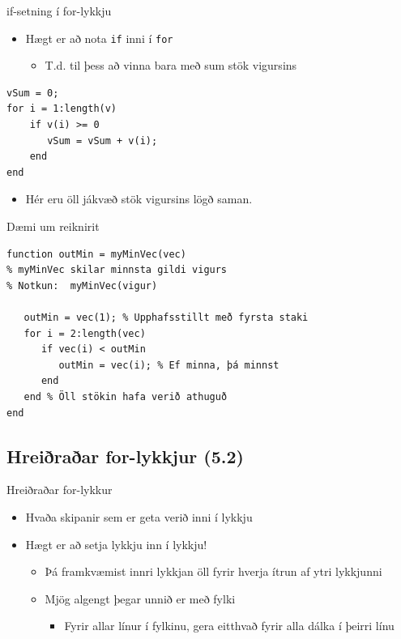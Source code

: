 \documentclass[handout]{beamer}
\begin{document}
\begin{frame}[fragile]{if-setning í for-lykkju}
\vspace{\baselineskip}
\begin{itemize}
 \item Hægt er að nota \texttt{if} inni í \texttt{for}
 \begin{itemize}
  \item T.d. til þess að vinna bara með sum stök vigursins
 \end{itemize}
\end{itemize}

\begin{verbatim}
vSum = 0;
for i = 1:length(v)
    if v(i) >= 0
       vSum = vSum + v(i);
    end
end
\end{verbatim}
\begin{itemize}
 \item Hér eru öll jákvæð stök vigursins lögð saman.
\end{itemize}
\end{frame}

\begin{frame}[fragile]{Dæmi um reiknirit}
\vspace{\baselineskip}
\begin{verbatim}
function outMin = myMinVec(vec)
% myMinVec skilar minnsta gildi vigurs
% Notkun:  myMinVec(vigur)
 
   outMin = vec(1); % Upphafsstillt með fyrsta staki
   for i = 2:length(vec)
      if vec(i) < outMin
         outMin = vec(i); % Ef minna, þá minnst
      end
   end % Öll stökin hafa verið athuguð
end
\end{verbatim}
\end{frame}

\subsection{Hreiðraðar for-lykkjur (5.2)}

\begin{frame}[fragile]{Hreiðraðar for-lykkur}
\begin{itemize}
 \item Hvaða skipanir sem er geta verið inni í lykkju
 \item Hægt er að setja lykkju inn í lykkju!
 \begin{itemize}
  \item Þá framkvæmist innri lykkjan öll fyrir hverja ítrun af ytri lykkjunni
  \item Mjög algengt þegar unnið er með fylki
  \begin{itemize}
   \item Fyrir allar línur í fylkinu, gera eitthvað fyrir alla dálka í þeirri línu
  \end{itemize}
 \end{itemize}
\end{itemize}
\end{frame}
\end{document}
